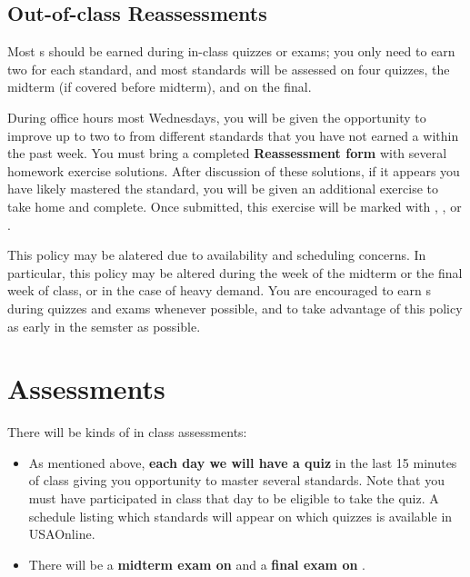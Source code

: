 {    \subsection*{\fontsize{10}{12}\selectfont Out-of-class Reassessments}
    Most \masteryMark{}s should be earned during in-class quizzes or exams;
    you only need to earn two for each standard, and most standards will be
    assessed on four quizzes, the midterm (if covered before midterm), and
    on the final.

    During office hours most Wednesdays, you will be given the opportunity to
    improve up to two \reattemptMark{} to \masteryMark{} from different
    standards that you have not earned a \masteryMark{} within the past week.
    You must bring a completed \textbf{Reassessment form} with several homework
    exercise solutions. After discussion of these solutions, if it appears you
    have likely mastered the standard,
    you will be given an additional exercise to take home and complete.
    Once submitted, this exercise will be marked with \masteryMark{},
    \minorMark{}, or \noMark{}.

    This policy may be alatered due to availability and scheduling
    concerns. In particular, this policy may be altered during the week
    of the midterm or the final week of class, or in the case of heavy
    demand. You are encouraged to earn \masteryMark{}s during quizzes and
    exams whenever possible, and to take advantage of this policy
    as early in the semster as possible.
}




\section*{\fontsize{12}{15}\selectfont Assessments}
There will be  kinds of in class assessments:
\begin{itemize}
\item As mentioned above, {\bf each day we will have a quiz} in the last 15 minutes of class giving you opportunity to master several standards.  Note that you must have participated in class that day to be eligible to take the quiz.  A schedule listing which standards will appear on which quizzes is available in USAOnline.
\item There will be a {\bf midterm exam on } and a {\bf final exam on }.
\end{itemize}


